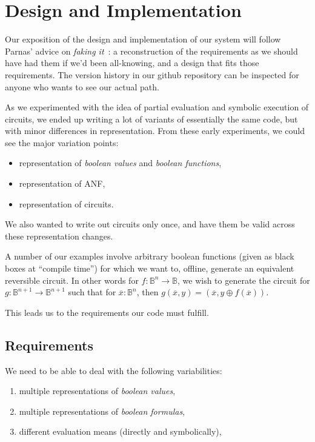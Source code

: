 \documentclass[sigplan,review]{acmart}
\newcommand{\Bool}{\ensuremath{\mathbb{B}}}
\begin{document}
\section{Design and Implementation}

Our exposition of the design and implementation of our system will
follow Parnas' advice on \emph{faking it}~\cite{ParnasFake}: a reconstruction
of the requirements as we should have had them if we'd been all-knowing,
and a design that fits those requirements. The version history in our github
repository can be inspected for anyone who wants to see our actual path.

As we experimented with the idea of partial evaluation and symbolic
execution of circuits, we ended up writing a lot of variants of
essentially the same code, but with minor differences in representation.
From these early experiments, we could see the major variation points:
\begin{itemize}
  \item representation of \emph{boolean values} and \emph{boolean functions},
  \item representation of ANF,
  \item representation of circuits.
\end{itemize}
We also wanted to write out circuits only once, and have them be valid
across these representation changes.

A number of our examples involve arbitrary boolean functions (given as black
boxes at ``compile time'') for which we want to, offline, generate an
equivalent reversible circuit. In other words for $f : \Bool^n \rightarrow\Bool$,
we wish to generate the circuit for $g : \Bool^{n+1} \rightarrow \Bool^{n+1}$ such
that for $\overline{x} : \Bool^n$, then 
$g(\overline{x},y) = (\overline{x}, y \oplus f(\overline{x}))$.

This leads us to the requirements our code must fulfill.

\subsection{Requirements}

We need to be able to deal with the following variabilities:
\begin{enumerate}
  \item multiple representations of \emph{boolean values},
  \item multiple representations of \emph{boolean formulas},
  \item different evaluation means (directly and symbolically),
\end{enumerate}
\end{document}
